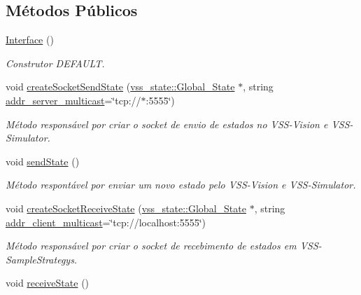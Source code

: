 \subsection*{Métodos Públicos}
\begin{DoxyCompactItemize}
\item 
\hyperlink{classInterface_a4406d74c75bdfe150bf72be1f1cda8b1}{Interface} ()\hypertarget{classInterface_a4406d74c75bdfe150bf72be1f1cda8b1}{}\label{classInterface_a4406d74c75bdfe150bf72be1f1cda8b1}

\begin{DoxyCompactList}\small\item\em Construtor D\+E\+F\+A\+U\+LT. \end{DoxyCompactList}\item 
void \hyperlink{classInterface_ac040c88e9847d23f6270a4932527e4d7}{create\+Socket\+Send\+State} (\hyperlink{classvss__state_1_1Global__State}{vss\+\_\+state\+::\+Global\+\_\+\+State} $\ast$, string \hyperlink{classInterface_ae3d7d6a6e2a04ab421b78ebeca7a92c6}{addr\+\_\+server\+\_\+multicast}=\char`\"{}tcp\+://$\ast$\+:5555\char`\"{})
\begin{DoxyCompactList}\small\item\em Método responsável por criar o socket de envio de estados no V\+S\+S-\/\+Vision e V\+S\+S-\/\+Simulator. \end{DoxyCompactList}\item 
void \hyperlink{classInterface_a9de875408d6ec60ef952d167ab244819}{send\+State} ()
\begin{DoxyCompactList}\small\item\em Método respontável por enviar um novo estado pelo V\+S\+S-\/\+Vision e V\+S\+S-\/\+Simulator. \end{DoxyCompactList}\item 
void \hyperlink{classInterface_ac494123d07a83b6e45702f0bfe465acf}{create\+Socket\+Receive\+State} (\hyperlink{classvss__state_1_1Global__State}{vss\+\_\+state\+::\+Global\+\_\+\+State} $\ast$, string \hyperlink{classInterface_af7ac56d5815f432e4b0ba1ae0e55087e}{addr\+\_\+client\+\_\+multicast}=\char`\"{}tcp\+://localhost\+:5555\char`\"{})
\begin{DoxyCompactList}\small\item\em Método responsável por criar o socket de recebimento de estados em V\+S\+S-\/\+Sample\+Strategys. \end{DoxyCompactList}\item 
void \hyperlink{classInterface_abba50a9d10639aa5b2f4a45be31b4062}{receive\+State} ()

\end{DoxyCompactItemize}
